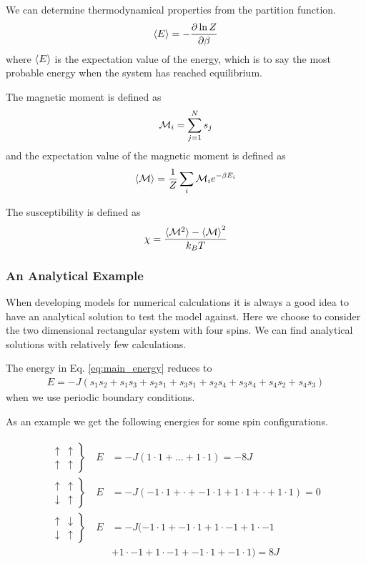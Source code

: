 \documentclass[11pt, a4paper]{article}
\newcommand{\pdiff}[2]{\frac{\partial #1}{\partial #2}}
\begin{document}
We can determine thermodynamical properties from the partition function. 
\begin{gather}
\braket{E} = -\pdiff{\ln Z}{\beta}
\label{eq:energy}
\end{gather}
where $\braket{E}$ is the expectation value of the energy, which is to say the most probable energy when the system has reached equilibrium. 

The magnetic moment is defined as
\begin{gather}
{\cal M}_i = \sum\limits_{j=1}^N s_j
\end{gather}
and the expectation value of the magnetic moment is defined as
\begin{gather}
\braket{\cal M} = \frac{1}{Z}\sum\limits_{i}{\cal M}_ie^{-\beta E_i}
\end{gather}

The susceptibility is defined as 
\begin{gather}
\chi = \frac{\braket{{\cal M}^2}-\braket{\cal M}^2}{k_BT}
\label{eq:main_suscept}
\end{gather}

\subsubsection{An Analytical Example}
When developing models for numerical calculations it is always a good idea to have an analytical solution to test the model against. Here we choose to consider the two dimensional rectangular system with four spins. We can find analytical solutions with relatively few calculations. 

The energy in Eq. \eqref{eq:main_energy} reduces to 
\begin{gather}
E = -J(s_1s_2 + s_1s_3 + s_2s_1  + s_3s_1 + s_2s_4 + s_3s_4 + s_4s_2 + s_4s_3)
\end{gather}
when we use periodic boundary conditions.

As an example we get the following energies for some spin configurations.

\begin{gather}
\begin{aligned}
\left.\begin{array}{ll}
	\uparrow & \uparrow\\
	\uparrow & \uparrow
\end{array}\right\}
\quad E &= -J(1\cdot1 + \dots + 1\cdot1) = -8J
\\
\left.\begin{array}{ll}
	\uparrow & \uparrow\\
	\downarrow & \uparrow
\end{array}\right\}
\quad E &= -J(-1\cdot1 + \cdot + -1\cdot1 +1\cdot1 + \cdot + 1\cdot1) = 0
\\
\left.\begin{array}{ll}
	\uparrow & \downarrow\\
	\downarrow & \uparrow
\end{array}\right\}
\quad E &= -J(-1\cdot1 + -1\cdot1 + 1\cdot-1 + 1\cdot-1 \\
&+1\cdot-1 + 1\cdot-1 + -1\cdot1 + -1\cdot1) = 8J
\end{aligned}
\end{gather}
\end{document}
